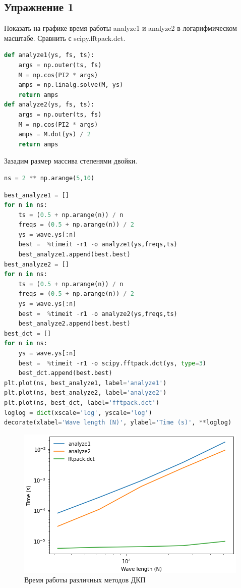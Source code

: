 \subsection{Упражнение 1}

Показать на графике время работы analyze1 и analyze2 в логарифмическом масштабе. Сравнить с scipy.fftpack.dct.

\begin{lstlisting}[language=Python]
def analyze1(ys, fs, ts):
    args = np.outer(ts, fs)
    M = np.cos(PI2 * args)
    amps = np.linalg.solve(M, ys)
    return amps
def analyze2(ys, fs, ts):
    args = np.outer(ts, fs)
    M = np.cos(PI2 * args)
    amps = M.dot(ys) / 2
    return amps
\end{lstlisting}

Зазадим размер массива степенями двойки.

\begin{lstlisting}[language=Python]
ns = 2 ** np.arange(5,10)
\end{lstlisting}

\begin{lstlisting}[language=Python]
best_analyze1 = []
for n in ns:
    ts = (0.5 + np.arange(n)) / n
    freqs = (0.5 + np.arange(n)) / 2
    ys = wave.ys[:n]
    best =  %timeit -r1 -o analyze1(ys,freqs,ts)
    best_analyze1.append(best.best)
best_analyze2 = []
for n in ns:
    ts = (0.5 + np.arange(n)) / n
    freqs = (0.5 + np.arange(n)) / 2
    ys = wave.ys[:n]
    best =  %timeit -r1 -o analyze2(ys,freqs,ts)
    best_analyze2.append(best.best)
best_dct = []
for n in ns:
    ys = wave.ys[:n]
    best =  %timeit -r1 -o scipy.fftpack.dct(ys, type=3)
    best_dct.append(best.best)
plt.plot(ns, best_analyze1, label='analyze1')
plt.plot(ns, best_analyze2, label='analyze2')
plt.plot(ns, best_dct, label='fftpack.dct')
loglog = dict(xscale='log', yscale='log')
decorate(xlabel='Wave length (N)', ylabel='Time (s)', **loglog)
\end{lstlisting}

\begin{figure}[H]
	\begin{center}
		\includegraphics[scale=1]{fig/lab06/lab6_1.png}
		\caption{Время работы различных методов ДКП}
	\end{center}
\end{figure}

